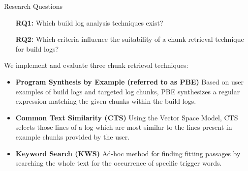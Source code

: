 \begin{simplebox}{Research Questions}
\begin{itemize}
  \item[\textbf{RQ1:}] Which build log analysis techniques exist?
  \item[\textbf{RQ2:}] Which criteria influence the suitability of a chunk
  retrieval technique for build logs?
\end{itemize}
\end{simplebox}



We implement and evaluate three chunk retrieval techniques:
\begin{itemize}
  \item \textbf{Program Synthesis by Example (referred to as PBE)}
  Based on user examples of build logs and targeted log chunks, PBE synthesizes
  a regular expression matching the given chunks within the build logs.
  \item \textbf{Common Text Similarity (CTS)}
  Using the Vector Space Model, CTS selects those lines of a log which are
  most similar to the lines present in example chunks provided by the user.
  \item \textbf{Keyword Search (KWS)}
  Ad-hoc method for finding fitting passages by searching the whole text for
  the occurrence of specific trigger words.
\end{itemize}

